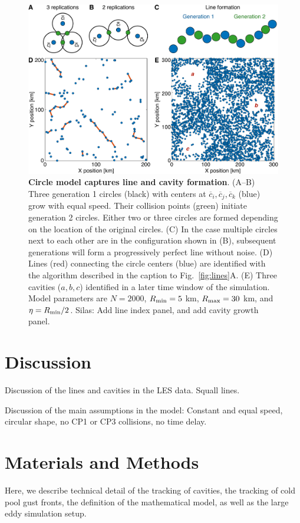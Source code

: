 \documentclass[reprint,amsmath,amssymb]{revtex4-1}
\begin{document}
\begin{figure}
\centering
\includegraphics[height=0.5\linewidth]{model}
\caption{{\bf Circle model captures line and cavity formation}. (A--B) Three generation 1 circles (black) with centers at $\overline{c}_i, \overline{c}_j, \overline{c}_k$ (blue) grow with equal speed. Their collision points (green) initiate generation 2 circles. Either two or three circles are formed depending on the location of the original circles. (C) In the case multiple circles next to each other are in the configuration shown in (B), subsequent generations will form a progressively perfect line without noise. (D) Lines (red) connecting the circle centers (blue) are identified with the algorithm described in the caption to Fig.~\ref{fig:lines}A. (E) Three cavities ($a,b,c$) identified in a later time window of the simulation. Model parameters are $N=2000$, $R_{\textnormal{min}}=5$ km, $R_{\textnormal{max}}=30$ km, and $\eta=R_{\textnormal{min}}/2$. {\color{red} Silas: Add line index panel, and add cavity growth panel.}}
\label{fig:model}
\end{figure}

\section{Discussion}
Discussion of the lines and cavities in the LES data. Squall lines.

Discussion of the main assumptions in the model: Constant and equal speed, circular shape, no CP1 or CP3 collisions, no time delay.

\section{Materials and Methods}
Here, we describe technical detail of the tracking of cavities, the tracking of cold pool gust fronts, the definition of the mathematical model, as well as the large eddy simulation setup.
\end{document}
